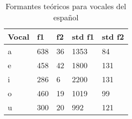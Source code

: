 \begin{table}[H]
\centering
\caption{Formantes teóricos para vocales del español \cite{Bradlow1995}}
\label{tab:formantes_teoricos}
\begin{tabular}{|l|l|l|l|l|}
\hline
\textbf{Vocal} & \textbf{f1} & \textbf{f2} & \textbf{std f1} & \textbf{std f2} \\ \hline
a   & 638 & 36 & 1353 & 84 \\ \hline
e   & 458 & 42 & 1800 & 131 \\ \hline
i   & 286 & 6  & 2200 & 131 \\ \hline
o   & 460 & 19 & 1019 & 99 \\ \hline
u   & 300 & 20 & 992  & 121 \\ \hline

\end{tabular}
\end{table}